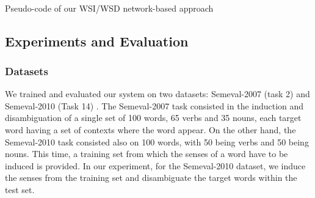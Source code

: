 ~

\begin{algorithm}[]
\SetAlgoLined
{}


\caption{Pseudo-code of our WSI/WSD network-based approach}
\label{alg:wsd}
\end{algorithm}

	
\subsection{Experiments and Evaluation}

\subsubsection{Datasets}
We trained and evaluated our system on two datasets: Semeval-2007 (task 2) \cite{semeval2007task2} and Semeval-2010 (Task 14) \cite{Semeval2010}. The Semeval-2007 task consisted in the induction and disambiguation of a single set of 100 words, 65 verbs and 35 nouns, each target word having a set of contexts where the word appear. On the other hand, the Semeval-2010 task consisted also on 100 words, with 50 being verbs and 50 being nouns. This time, a training set from which the senses of a word have to be induced is provided. In our experiment, for the Semeval-2010 dataset, we induce the senses from the training set and disambiguate the target words within the test set.

